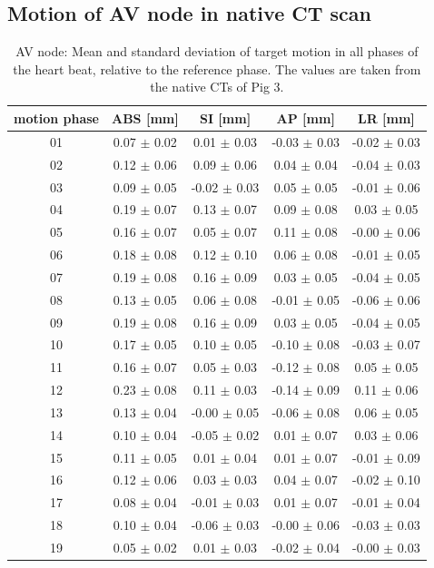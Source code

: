 \documentclass[type=dr, dr=rernat, accentcolor=tud7b,colorbacktitle, bigchapter, openright, twoside, 12pt ]{tudthesis}
\begin{document}
\newpage

\subsection*{Motion of AV node in native CT scan}

\begin{table}[H]
  \centering
    \small
  \caption{AV node: Mean and standard deviation of target motion in all phases of the heart beat, relative to the reference phase. The values are 
  taken from the native CTs of Pig 3.}
  \begin{tabular}{|c|c|c|c|c|}
    \hline\hline
    motion phase\rule{0pt}{2.6ex}\rule[-1.2ex]{0pt}{0pt} & ABS [mm] & SI [mm] & AP [mm] & LR [mm]\\
    \hline
01&0.07 $\pm$ 0.02 &0.01 $\pm$ 0.03 &-0.03 $\pm$ 0.03 &-0.02 $\pm$ 0.03 \\
02&0.12 $\pm$ 0.06 &0.09 $\pm$ 0.06 &0.04 $\pm$ 0.04 &-0.04 $\pm$ 0.03 \\
03&0.09 $\pm$ 0.05 &-0.02 $\pm$ 0.03 &0.05 $\pm$ 0.05 &-0.01 $\pm$ 0.06 \\
04&0.19 $\pm$ 0.07 &0.13 $\pm$ 0.07 &0.09 $\pm$ 0.08 &0.03 $\pm$ 0.05 \\
05&0.16 $\pm$ 0.07 &0.05 $\pm$ 0.07 &0.11 $\pm$ 0.08 &-0.00 $\pm$ 0.06 \\
06&0.18 $\pm$ 0.08 &0.12 $\pm$ 0.10 &0.06 $\pm$ 0.08 &-0.01 $\pm$ 0.05 \\
07&0.19 $\pm$ 0.08 &0.16 $\pm$ 0.09 &0.03 $\pm$ 0.05 &-0.04 $\pm$ 0.05 \\
08&0.13 $\pm$ 0.05 &0.06 $\pm$ 0.08 &-0.01 $\pm$ 0.05 &-0.06 $\pm$ 0.06 \\
09&0.19 $\pm$ 0.08 &0.16 $\pm$ 0.09 &0.03 $\pm$ 0.05 &-0.04 $\pm$ 0.05 \\
10&0.17 $\pm$ 0.05 &0.10 $\pm$ 0.05 &-0.10 $\pm$ 0.08 &-0.03 $\pm$ 0.07 \\
11&0.16 $\pm$ 0.07 &0.05 $\pm$ 0.03 &-0.12 $\pm$ 0.08 &0.05 $\pm$ 0.05 \\
12&0.23 $\pm$ 0.08 &0.11 $\pm$ 0.03 &-0.14 $\pm$ 0.09 &0.11 $\pm$ 0.06 \\
13&0.13 $\pm$ 0.04 &-0.00 $\pm$ 0.05 &-0.06 $\pm$ 0.08 &0.06 $\pm$ 0.05 \\
14&0.10 $\pm$ 0.04 &-0.05 $\pm$ 0.02 &0.01 $\pm$ 0.07 &0.03 $\pm$ 0.06 \\
15&0.11 $\pm$ 0.05 &0.01 $\pm$ 0.04 &0.01 $\pm$ 0.07 &-0.01 $\pm$ 0.09 \\ 
16&0.12 $\pm$ 0.06 &0.03 $\pm$ 0.03 &0.04 $\pm$ 0.07 &-0.02 $\pm$ 0.10 \\
17&0.08 $\pm$ 0.04 &-0.01 $\pm$ 0.03 &0.01 $\pm$ 0.07 &-0.01 $\pm$ 0.04 \\
18&0.10 $\pm$ 0.04 &-0.06 $\pm$ 0.03 &-0.00 $\pm$ 0.06 &-0.03 $\pm$ 0.03 \\
19&0.05 $\pm$ 0.02 &0.01 $\pm$ 0.03 &-0.02 $\pm$ 0.04 &-0.00 $\pm$ 0.03 \\
    \hline\hline
  \end{tabular}
  \label{tab:motion:native:AV:Pig3}
\end{table}
 
\end{document}
